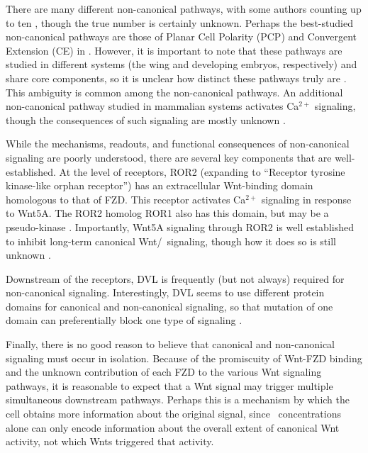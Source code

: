 There are many different non-canonical pathways, with some authors counting
up to ten \cite{Malhotra2009}, though the true number is
certainly unknown. Perhaps the best-studied non-canonical
pathways are those of Planar Cell Polarity (PCP) and Convergent Extension (CE) in \fly.
However, it is important to note that these pathways are studied in different
systems (the wing and developing embryos, respectively)
and share core components, so it is unclear how distinct these pathways truly
are \cite{VanAmerongen2012}. This ambiguity is common among the non-canonical pathways. An additional
non-canonical pathway studied in mammalian systems activates
Ca$^{2+}$ signaling, though the consequences of such
signaling are mostly unknown \cite{De2011}.


While the mechanisms, readouts, and functional consequences of non-canonical signaling
are poorly understood, there are several key components that are well-established.
At the level of receptors, ROR2 (expanding to ``Receptor tyrosine kinase-like
orphan receptor'') has an extracellular Wnt-binding domain homologous to
that of FZD. This receptor activates Ca$^{2+}$ signaling in response
to Wnt5A. The ROR2 homolog ROR1 also has this domain,
but may be a pseudo-kinase \cite{VanAmerongen2012}.
Importantly, Wnt5A signaling through ROR2 is well established to inhibit long-term
canonical Wnt/\bcat\ signaling, though how it does so is still unknown
\cite{Huang2004,Angers2009,Malhotra2009,VanAmerongen2012}.


Downstream of the receptors, DVL is frequently (but not always) 
required for non-canonical signaling. Interestingly, DVL seems to use different
protein domains for canonical and non-canonical signaling, so that mutation of
one domain can preferentially block one type of signaling \cite{Gao2010,VanAmerongen2012}.


Finally, there is no good reason to believe that canonical and
non-canonical signaling must occur in isolation. Because of the
promiscuity of Wnt-FZD binding and the unknown contribution of each
FZD to the various Wnt signaling pathways, it is reasonable to
expect that a Wnt signal may trigger multiple simultaneous downstream pathways.
Perhaps this is a mechanism by which the cell obtains more information
about the original signal, since \bcat\ concentrations alone can only encode
information about the overall extent of canonical Wnt activity, not which 
Wnts triggered that activity.